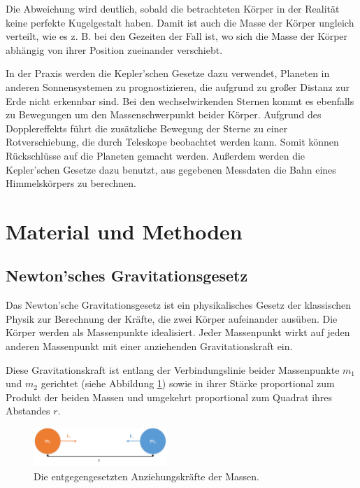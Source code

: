 \documentclass[10pt,twocolumn]{scrartcl}
\begin{document}
Die Abweichung wird deutlich, sobald die betrachteten Körper in der Realität keine perfekte Kugelgestalt haben. Damit ist auch die Masse der Körper ungleich verteilt, wie es z. B. bei den Gezeiten der Fall ist, wo sich die Masse der Körper abhängig von ihrer Position zueinander verschiebt.

In der Praxis werden die Kepler'schen Gesetze dazu verwendet, Planeten in anderen Sonnensystemen zu prognostizieren, die aufgrund zu großer Distanz zur Erde nicht erkennbar sind. Bei den wechselwirkenden Sternen kommt es ebenfalls zu Bewegungen um den Massenschwerpunkt beider Körper. Aufgrund des Dopplereffekts führt die zusätzliche Bewegung der Sterne zu einer Rotverschiebung, die durch Teleskope beobachtet werden kann. Somit können Rückschlüsse auf die Planeten gemacht werden. Außerdem werden die Kepler'schen Gesetze dazu benutzt, aus gegebenen Messdaten die Bahn eines Himmelskörpers zu berechnen.


\section{Material und Methoden}

\subsection{Newton'sches Gravitationsgesetz}
Das Newton'sche Gravitationsgesetz ist ein physikalisches Gesetz der klassischen Physik zur Berechnung der Kräfte, die zwei Körper aufeinander ausüben. Die Körper werden als Massenpunkte idealisiert. Jeder Massenpunkt wirkt auf jeden anderen Massenpunkt mit einer anziehenden Gravitationskraft ein.

Diese Gravitationskraft ist entlang der Verbindungslinie beider Massenpunkte $m_1$ und $m_2$ gerichtet (siehe Abbildung \ref{fig:newton}) sowie in ihrer Stärke proportional zum Produkt der beiden Massen und umgekehrt proportional zum Quadrat ihres Abstandes $r$. \cite{Wiki15a}

\begin{figure}[t]
\centering
\includegraphics[width=0.45\textwidth]{Bilder/Newton.png}
\caption{Die entgegengesetzten Anziehungskräfte der Massen.}
\label{fig:newton}
\end{figure}
\end{document}
